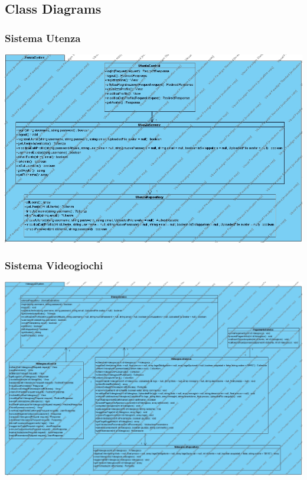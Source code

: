 \subsection{Class Diagrams}
\subsubsection{Sistema Utenza}
\begin{center}
\includegraphics[width=\textwidth,height=\textheight,keepaspectratio]{Figure/ClassDiagramUtenza.jpg}
\end{center}

\subsubsection{Sistema Videogiochi}
\begin{center}
\includegraphics[width=\textwidth,height=\textheight,keepaspectratio]{Figure/ClassDiagramVideogioco.jpg}
\end{center}


